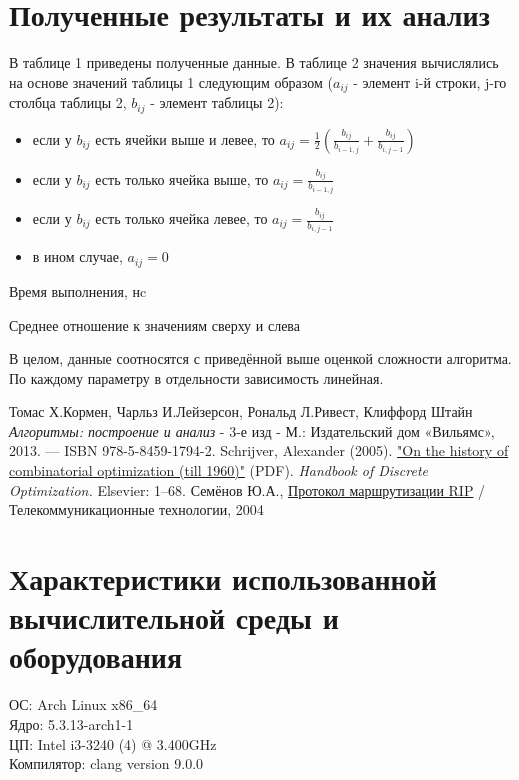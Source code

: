 \documentclass[a4paper,12pt]{article}
\begin{document}
\section{Полученные результаты и их анализ}
В таблице 1 приведены полученные данные.
В таблице 2 значения вычислялись на основе значений таблицы 1 следующим образом
($a_{ij}$ - элемент i-й строки, j-го столбца таблицы 2, $b_{ij}$ - элемент таблицы 2):
\begin{itemize}
  \item если у $b_{ij}$ есть ячейки выше и левее, то 
  $a_{ij} = \frac12 \left(\frac{b_{ij}}{b_{i-1, j}} + \frac{b_{ij}}{b_{i, j-1}}\right)$
  \item если у $b_{ij}$ есть только ячейка выше, то
  $a_{ij} = \frac{b_{ij}}{b_{i-1, j}}$ 
  \item если у $b_{ij}$ есть только ячейка левее, то
  $a_{ij} = \frac{b_{ij}}{b_{i, j-1}}$
  \item в ином случае, $a_{ij} = 0$
\end{itemize}
\begin{center}
  \begin{table}[h]
    \centering
    \caption{Время выполнения, нc}
  \end{table}
  \begin{table}[h]
    \centering
    \caption{Среднее отношение к значениям сверху и слева}
  \end{table}
\end{center}
В целом, данные соотносятся с приведённой выше оценкой сложности алгоритма.
По каждому параметру в отдельности зависимость линейная.
\begin{thebibliography}{9}
    Томас Х.Кормен, Чарльз И.Лейзерсон, Рональд Л.Ривест, Клиффорд Штайн
    \textit{Алгоритмы: построение и анализ}
    - 3-е изд - М.: Издательский дом «Вильямс», 2013. — ISBN 978-5-8459-1794-2.
    Schrijver, Alexander (2005). 
    \href{https://homepages.cwi.nl/~lex/files/histco.pdf}
    {"On the history of combinatorial optimization (till 1960)"} (PDF).
    \textit{Handbook of Discrete Optimization.} Elsevier: 1–68.
    Семёнов Ю.А.,
    \href{http://citforum.ru/nets/semenov/4/44/rip44111.shtml}{Протокол маршрутизации RIP}
    / Телекоммуникационные технологии, 2004
    
\end{thebibliography}
\section{Характеристики использованной вычислительной среды и оборудования}
ОС: Arch Linux x86\_64 \\
Ядро: 5.3.13-arch1-1 \\
ЦП: Intel i3-3240 (4) @ 3.400GHz \\
Компилятор: clang version 9.0.0
\end{document}
